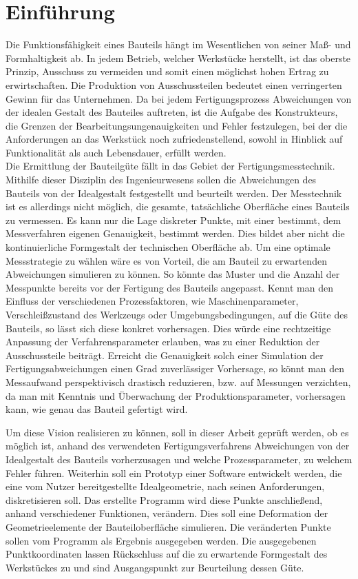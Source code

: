 \section{Einführung}
\label{sec:einfuehrung}

Die Funktionsfähigkeit eines Bauteils hängt im Wesentlichen von seiner Maß- und Formhaltigkeit ab. In jedem Betrieb, welcher Werkstücke herstellt, ist das oberste Prinzip, Ausschuss zu vermeiden und somit einen möglichst hohen Ertrag zu erwirtschaften. Die Produktion von Ausschussteilen bedeutet einen verringerten Gewinn für das Unternehmen. Da bei jedem Fertigungsprozess Abweichungen von der idealen Gestalt des Bauteiles auftreten, ist die Aufgabe des Konstrukteurs, die Grenzen der Bearbeitungsungenauigkeiten und Fehler festzulegen, bei der die Anforderungen an das Werkstück noch zufriedenstellend, sowohl in Hinblick auf Funktionalität als auch Lebensdauer, erfüllt werden.\\
Die Ermittlung der Bauteilgüte fällt in das Gebiet der Fertigungsmesstechnik. Mithilfe dieser Disziplin des Ingenieurwesens sollen die Abweichungen des Bauteils von der Idealgestalt festgestellt und beurteilt werden. Der Messtechnik ist es allerdings nicht möglich, die gesamte, tatsächliche Oberfläche eines Bauteils zu vermessen. Es kann nur die Lage diskreter Punkte, mit einer bestimmt, dem Messverfahren eigenen Genauigkeit, bestimmt werden. Dies bildet aber nicht die kontinuierliche Formgestalt der technischen Oberfläche ab. Um eine optimale Messstrategie zu wählen wäre es von Vorteil, die am Bauteil zu erwartenden Abweichungen simulieren zu können. So könnte das Muster und die Anzahl der Messpunkte bereits vor der Fertigung des Bauteils angepasst. Kennt man den Einfluss der verschiedenen Prozessfaktoren, wie Maschinenparameter, Verschleißzustand des Werkzeugs oder Umgebungsbedingungen, auf die Güte des Bauteils, so lässt sich diese konkret vorhersagen. Dies würde eine rechtzeitige Anpassung der Verfahrensparameter erlauben, was zu einer Reduktion der Ausschussteile beiträgt. Erreicht die Genauigkeit solch einer Simulation der Fertigungsabweichungen einen Grad zuverlässiger Vorhersage, so könnt man den Messaufwand perspektivisch drastisch reduzieren, bzw. auf Messungen verzichten, da man mit Kenntnis und Überwachung der Produktionsparameter, vorhersagen kann, wie genau das Bauteil gefertigt wird.

Um diese Vision realisieren zu können, soll in dieser Arbeit geprüft werden, ob es möglich ist, anhand des verwendeten Fertigungsverfahrens Abweichungen von der Idealgestalt des Bauteils vorherzusagen und welche Prozessparameter, zu welchem Fehler führen. 
Weiterhin soll ein Prototyp einer Software entwickelt werden, die eine vom Nutzer bereitgestellte Idealgeometrie, nach seinen Anforderungen, diskretisieren soll. Das erstellte Programm wird diese Punkte anschließend, anhand verschiedener Funktionen, verändern. Dies soll eine Deformation der Geometrieelemente der Bauteiloberfläche simulieren. Die veränderten Punkte sollen vom Programm als Ergebnis ausgegeben werden. Die ausgegebenen Punktkoordinaten lassen Rückschluss auf die zu erwartende Formgestalt des Werkstückes zu und sind Ausgangspunkt zur Beurteilung dessen Güte.          



